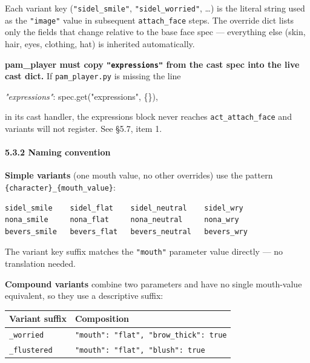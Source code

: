 \documentclass[
  12pt,
  letterpaper,
]{book}
\newenvironment{Shaded}{}{}
\newcommand{\CommentTok}[1]{\textcolor[rgb]{0.38,0.63,0.69}{\textit{#1}}}
\newcommand{\NormalTok}[1]{#1}
\newcommand{\StringTok}[1]{\textcolor[rgb]{0.25,0.44,0.63}{#1}}
\begin{document}
Each variant key (\texttt{"sidel\_smile"}, \texttt{"sidel\_worried"},
\ldots) is the literal string used as the \texttt{"image"} value in
subsequent \texttt{attach\_face} steps. The override dict lists only the
fields that change relative to the base face spec --- everything else
(skin, hair, eyes, clothing, hat) is inherited automatically.

\textbf{pam\_player must copy \texttt{"expressions"} from the cast spec
into the live cast dict.} If \texttt{pam\_player.py} is missing the line

\begin{Shaded}
\begin{Highlighting}[]
\CommentTok{"expressions"}\NormalTok{: spec.get(}\StringTok{"expressions"}\NormalTok{, \{\}),}
\end{Highlighting}
\end{Shaded}

in its cast handler, the expressions block never reaches
\texttt{act\_attach\_face} and variants will not register. See §5.7,
item 1.

\paragraph{5.3.2 Naming convention}\label{naming-convention}

\textbf{Simple variants} (one mouth value, no other overrides) use the
pattern \texttt{\{character\}\_\{mouth\_value\}}:

\begin{verbatim}
sidel_smile    sidel_flat    sidel_neutral    sidel_wry
nona_smile     nona_flat     nona_neutral     nona_wry
bevers_smile   bevers_flat   bevers_neutral   bevers_wry
\end{verbatim}

The variant key suffix matches the \texttt{"mouth"} parameter value
directly --- no translation needed.

\textbf{Compound variants} combine two parameters and have no single
mouth-value equivalent, so they use a descriptive suffix:

\begin{longtable}[]{@{}ll@{}}
\toprule\noalign{}
Variant suffix & Composition \\
\midrule\noalign{}
\endhead
\bottomrule\noalign{}
\endlastfoot
\texttt{\_worried} & \texttt{"mouth":\ "flat",\ "brow\_thick":\ true} \\
\texttt{\_flustered} & \texttt{"mouth":\ "flat",\ "blush":\ true} \\
\end{longtable}
\end{document}
